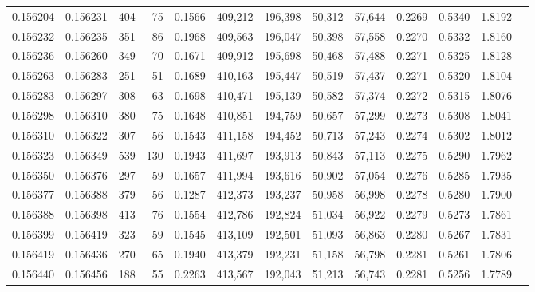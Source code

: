 \begin{tabular}{rrrrrrrrrrrrr}
0.156204 & 0.156231 &   404 &  75 &                                     0.1566 & 409,212 & 196,398 &  50,312 &  57,644 & 0.2269 & 0.5340 & 1.8192 \\
0.156232 & 0.156235 &   351 &  86 &                                     0.1968 & 409,563 & 196,047 &  50,398 &  57,558 & 0.2270 & 0.5332 & 1.8160 \\
0.156236 & 0.156260 &   349 &  70 &                                     0.1671 & 409,912 & 195,698 &  50,468 &  57,488 & 0.2271 & 0.5325 & 1.8128 \\
0.156263 & 0.156283 &   251 &  51 &                                     0.1689 & 410,163 & 195,447 &  50,519 &  57,437 & 0.2271 & 0.5320 & 1.8104 \\
0.156283 & 0.156297 &   308 &  63 &                                     0.1698 & 410,471 & 195,139 &  50,582 &  57,374 & 0.2272 & 0.5315 & 1.8076 \\
0.156298 & 0.156310 &   380 &  75 &                                     0.1648 & 410,851 & 194,759 &  50,657 &  57,299 & 0.2273 & 0.5308 & 1.8041 \\
0.156310 & 0.156322 &   307 &  56 &                                     0.1543 & 411,158 & 194,452 &  50,713 &  57,243 & 0.2274 & 0.5302 & 1.8012 \\
0.156323 & 0.156349 &   539 & 130 &                                     0.1943 & 411,697 & 193,913 &  50,843 &  57,113 & 0.2275 & 0.5290 & 1.7962 \\
0.156350 & 0.156376 &   297 &  59 &                                     0.1657 & 411,994 & 193,616 &  50,902 &  57,054 & 0.2276 & 0.5285 & 1.7935 \\
0.156377 & 0.156388 &   379 &  56 &                                     0.1287 & 412,373 & 193,237 &  50,958 &  56,998 & 0.2278 & 0.5280 & 1.7900 \\
0.156388 & 0.156398 &   413 &  76 &                                     0.1554 & 412,786 & 192,824 &  51,034 &  56,922 & 0.2279 & 0.5273 & 1.7861 \\
0.156399 & 0.156419 &   323 &  59 &                                     0.1545 & 413,109 & 192,501 &  51,093 &  56,863 & 0.2280 & 0.5267 & 1.7831 \\
0.156419 & 0.156436 &   270 &  65 &                                     0.1940 & 413,379 & 192,231 &  51,158 &  56,798 & 0.2281 & 0.5261 & 1.7806 \\
0.156440 & 0.156456 &   188 &  55 &                                     0.2263 & 413,567 & 192,043 &  51,213 &  56,743 & 0.2281 & 0.5256 & 1.7789 \\

\end{tabular}
